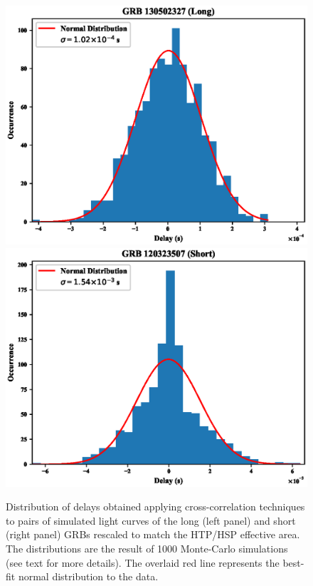 \documentclass[]{spie}  %
\begin{document}
\begin{figure}[h!]
\centering
\includegraphics[scale=0.45,angle=0]{fig/distribution_long_56.eps}
\includegraphics[scale=0.45,angle=0]{fig/distribution_short_56.eps}
\caption{Distribution of delays obtained applying cross-correlation techniques to pairs of simulated light curves of the long (left panel) and short (right panel) GRBs rescaled to match the HTP/HSP effective area. The distributions are the result of 1000 Monte-Carlo simulations (see text for more details). The overlaid red line represents the best-fit normal distribution to the data.} 
\label{fig:xc_sigma}
\end{figure}
\end{document}

